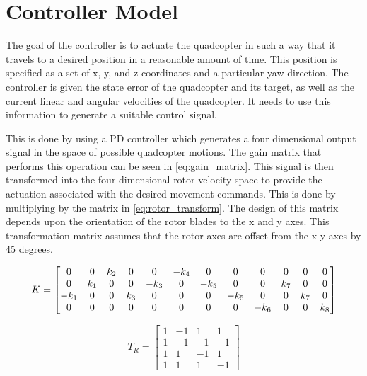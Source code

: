 \documentclass[letterpaper,12pt,titlepage,oneside,final]{book}
\begin{document}
\section{Controller Model}


The goal of the controller is to actuate the quadcopter in such a way that it travels to a desired position in a reasonable amount of time. 
This position is specified as a set of x, y, and z coordinates and a particular yaw direction. 
The controller is given the state error of the quadcopter and its target, as well as the current linear and angular velocities of the quadcopter. 
It needs to use this information to generate a suitable control signal.

This is done by using a PD controller which generates a four dimensional output signal in the space of possible quadcopter motions. 
The gain matrix that performs this operation can be seen in \eqref{eq:gain_matrix}. 
This signal is then transformed into the four dimensional rotor velocity space to provide the actuation associated with the desired movement commands. 
This is done by multiplying by the matrix in \eqref{eq:rotor_transform}. 
The design of this matrix depends upon the orientation of the rotor blades to the x and y axes. 
This transformation matrix assumes that the rotor axes are offset from the x-y axes by 45 degrees.

\begin{equation} \label{eq:gain_matrix}
K =
\setcounter{MaxMatrixCols}{12}
\begin{bmatrix}
0 & 0 & k_{2} & 0 & 0 & -k_{4} & 0 & 0 & 0 & 0 & 0 & 0 \\
0 & k_{1} & 0 & 0 & -k_{3} & 0 & -k_{5} & 0 & 0 & k_{7} & 0 & 0 \\
-k_{1} & 0 & 0 & k_{3} & 0 & 0 & 0 & -k_{5} & 0 & 0 & k_{7} & 0 \\
0 & 0 & 0 & 0 & 0 & 0 & 0 & 0 & -k_{6} & 0 & 0 & k_{8}
\end{bmatrix}
\end{equation}

\begin{equation} \label{eq:rotor_transform}
T_{R} = 
\begin{bmatrix}
1 & -1 & 1 & 1 \\
1 & -1 & -1 & -1 \\
1 & 1 & -1 & 1 \\
1 & 1 & 1 & -1
\end{bmatrix}
\end{equation}
\end{document}
